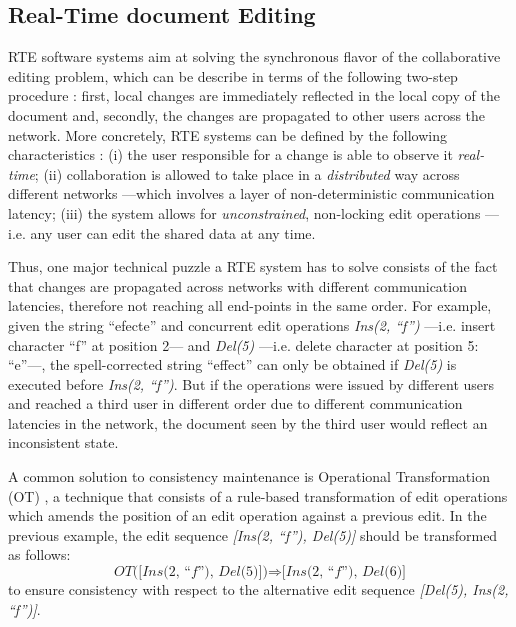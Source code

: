 \documentclass{sig-alternate}
\begin{document}
\subsection{Real-Time document Editing}\label{subsec:rte}
RTE software systems aim at solving the synchronous flavor of the collaborative editing
problem, which can be describe in terms of the following two-step procedure \cite{Imine2009}:
first, local changes are immediately reflected in the local copy of the document and, secondly,
the changes are propagated to other users across the network.
More concretely, RTE systems can be defined by the following characteristics \cite{Sun1998}:
(i) the user responsible for a change is able to observe it \textit{real-time};
(ii) collaboration is allowed to take place in a \textit{distributed} way across
different networks ---which involves a layer of non-deterministic communication
latency; (iii) the system allows for \textit{unconstrained}, non-locking edit operations ---i.e.
any user can edit the shared data at any time.

Thus, one major technical puzzle a RTE system has to solve consists of the fact that changes
are propagated across networks with different communication latencies, therefore not
reaching all end-points in the same order. For example, given
the string ``efecte'' and concurrent edit operations \textit{Ins(2, ``f'')} ---i.e.
insert character ``f'' at position 2--- and \textit{Del(5)} ---i.e.
delete character at position 5: ``e''---, the spell-corrected string ``effect''
can only be obtained if \textit{Del(5)} is executed before \textit{Ins(2, ``f'')}.
But if the operations were issued by different users and reached a third user in different
order due to different communication latencies in the network,
the document seen by the third user would reflect an inconsistent state.

A common solution to consistency maintenance is Operational Transformation
(OT) \cite{SuClarence}, a technique that consists of a rule-based transformation
of edit operations which amends the position of an edit operation against a previous edit.
In the previous example, the edit sequence \textit{[Ins(2, ``f''), Del(5)]} should be
transformed as follows:
\begin{equation*}
  \textit{OT([Ins(2, ``f''), Del(5)])} \Rightarrow \textit{[Ins(2, ``f''), Del(6)]}
\end{equation*}
to ensure consistency with respect to the alternative edit sequence
\textit{[Del(5), Ins(2, ``f'')]}.

\end{document}
